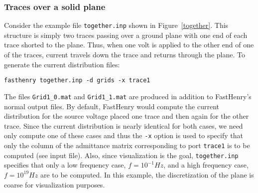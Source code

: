 \subsubsection{Traces over a solid plane}
Consider the example file {\tt together.inp} shown in
Figure~\ref{together}.  This structure is simply two traces passing
over a ground plane with one end of each trace shorted to the plane.
Thus, when one volt is applied to the other end of one of the traces,
current travels down the trace and returns through the plane.  To
generate the current distribution files:
\begin{verbatim}
fasthenry together.inp -d grids -x trace1
\end{verbatim}
The files {\tt Grid1\_0.mat} and {\tt Grid1\_1.mat} are produced in
addition to FastHenry's normal output files. By
default, FastHenry would compute the current distribution for the
source voltage placed one trace and then again for the other trace.
Since the current distribution is nearly identical for both cases, we
need only compute one of these cases and thus the {\tt -x} option is
used to specify that only the column of the admittance matrix
corresponding to port {\tt trace1} is to be computed (see input file).
Also, since visualization is the goal, {\tt together.inp} specifies
that only a low frequency case, $f = 10^{-1} Hz$, and a high frequency
case, $f = 10^{19} Hz$ are to be computed. In this example, the
discretization of the plane is coarse for visualization purposes.  

\begin{figure}
\centerline{
}
\caption{}
\label{together_DC}
\end{figure}

\begin{figure}
\centerline{
}
\caption{}
\label{together_highf}
\end{figure}

